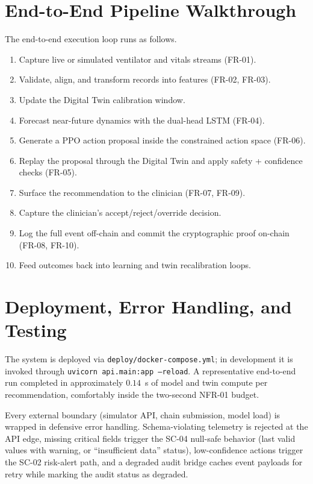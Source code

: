\documentclass[12pt,a4paper,oneside]{report}
\begin{document}
\section{End-to-End Pipeline Walkthrough}
The end-to-end execution loop runs as follows.
\begin{enumerate}[leftmargin=*]
  \item Capture live or simulated ventilator and vitals streams (FR-01).
  \item Validate, align, and transform records into features (FR-02, FR-03).
  \item Update the Digital Twin calibration window.
  \item Forecast near-future dynamics with the dual-head LSTM (FR-04).
  \item Generate a PPO action proposal inside the constrained action space (FR-06).
  \item Replay the proposal through the Digital Twin and apply safety + confidence checks (FR-05).
  \item Surface the recommendation to the clinician (FR-07, FR-09).
  \item Capture the clinician's accept/reject/override decision.
  \item Log the full event off-chain and commit the cryptographic proof on-chain (FR-08, FR-10).
  \item Feed outcomes back into learning and twin recalibration loops.
\end{enumerate}

\section{Deployment, Error Handling, and Testing}
The system is deployed via \texttt{deploy/docker-compose.yml}; in development it is invoked through \texttt{uvicorn api.main:app --reload}. A representative end-to-end run completed in approximately $0.14$~s of model and twin compute per recommendation, comfortably inside the two-second NFR-01 budget.

Every external boundary (simulator API, chain submission, model load) is wrapped in defensive error handling. Schema-violating telemetry is rejected at the API edge, missing critical fields trigger the SC-04 null-safe behavior (last valid values with warning, or ``insufficient data'' status), low-confidence actions trigger the SC-02 risk-alert path, and a degraded audit bridge caches event payloads for retry while marking the audit status as degraded.
\end{document}
